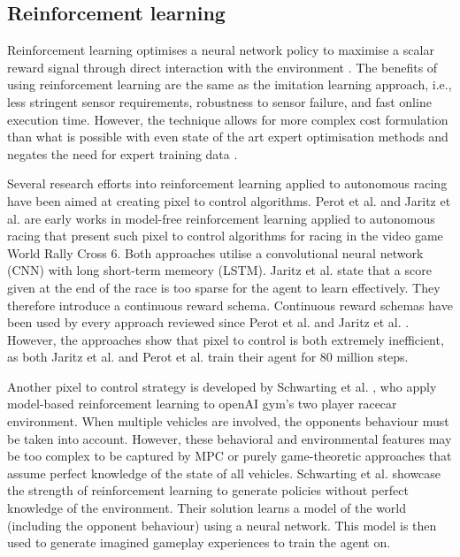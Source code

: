 \subsection{Reinforcement learning}
\label{sec:reinforcement_learning}

Reinforcement learning optimises a neural network policy to maximise a scalar reward signal through direct interaction with the environment \cite{Plaat_2022}. 
The benefits of using reinforcement learning are the same as the imitation learning approach, i.e., less stringent sensor requirements, robustness to sensor failure, and fast online execution time. However, the technique allows for more complex cost formulation than what is possible with even state of the art expert optimisation methods and negates the need for expert training data \cite{Fuchs2021}.


Several research efforts into reinforcement learning applied to autonomous racing have been aimed at creating pixel to control algorithms. 
Perot et al. \cite{Perot2017} and Jaritz et al. \cite{Jaritz2018} are early works in model-free reinforcement learning applied to autonomous racing that present such pixel to control algorithms for racing in the video game World Rally Cross 6.
Both approaches utilise a convolutional neural network (CNN) with long short-term memeory (LSTM). 
Jaritz et al. \cite{Jaritz2018} state that a score given at the end of the race is too sparse for the agent to learn effectively.
They therefore introduce a continuous reward schema.
Continuous reward schemas have been used by every approach reviewed since Perot et al. \cite{Perot2017} and Jaritz et al. \cite{Jaritz2018}.
However, the approaches show that pixel to control is both extremely inefficient, as both Jaritz et al. \cite{Jaritz2018} and Perot et al. \cite{Perot2017} train their agent for 80 million steps.



Another pixel to control strategy is developed by Schwarting et al. \cite{Schwarting2021}, who apply model-based reinforcement learning to openAI gym's two player racecar environment.
When multiple vehicles are involved, the opponents behaviour must be taken into account.
However, these behavioral and environmental features may be too complex to be captured by MPC or purely game-theoretic approaches that assume perfect knowledge of the state of all vehicles.
Schwarting et al. \cite{Schwarting2021} showcase the strength of reinforcement learning to generate policies without perfect knowledge of the environment.
Their solution learns a model of the world (including the opponent behaviour) using a neural network.
This model is then used to generate imagined gameplay experiences to train the agent on.


